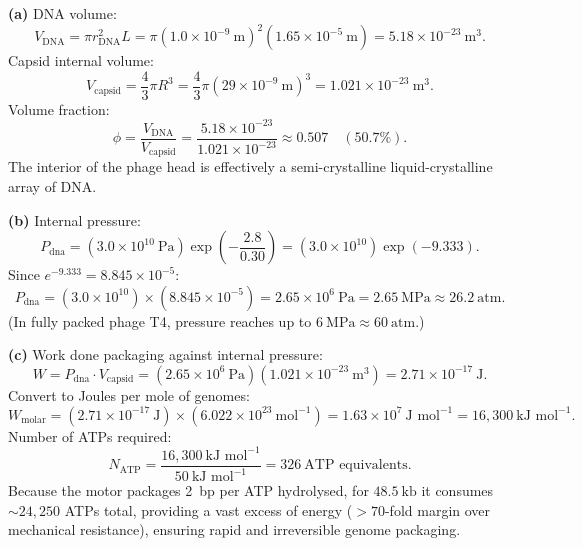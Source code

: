 \documentclass[12pt, a4paper, oneside]{report}
\begin{document}
\begin{solution}
  \textbf{(a)} DNA volume:
  \[
    V_{\text{DNA}} = \pi r_{\text{DNA}}^2 L = \pi (1.0 \times 10^{-9}~\text{m})^2 (1.65 \times 10^{-5}~\text{m}) = 5.18 \times 10^{-23}~\text{m}^3.
  \]
  Capsid internal volume:
  \[
    V_{\text{capsid}} = \frac{4}{3}\pi R^3 = \frac{4}{3}\pi (29 \times 10^{-9}~\text{m})^3 = 1.021 \times 10^{-23}~\text{m}^3.
  \]
  Volume fraction:
  \[
    \phi = \frac{V_{\text{DNA}}}{V_{\text{capsid}}} = \frac{5.18 \times 10^{-23}}{1.021 \times 10^{-23}} \approx 0.507 \quad (50.7\%).
  \]
  The interior of the phage head is effectively a semi-crystalline liquid-crystalline array of DNA.

  \textbf{(b)} Internal pressure:
  \[
    P_{\text{dna}} = (3.0 \times 10^{10}~\text{Pa}) \exp\left(-\frac{2.8}{0.30}\right) = (3.0 \times 10^{10}) \exp(-9.333).
  \]
  Since $e^{-9.333} = 8.845 \times 10^{-5}$:
  \[
    P_{\text{dna}} = (3.0 \times 10^{10}) \times (8.845 \times 10^{-5}) = 2.65 \times 10^6~\text{Pa} = 2.65~\text{MPa} \approx 26.2~\text{atm}.
  \]
  (In fully packed phage T4, pressure reaches up to $6~\text{MPa} \approx 60~\text{atm}$.)

  \textbf{(c)} Work done packaging against internal pressure:
  \[
    W = P_{\text{dna}} \cdot V_{\text{capsid}} = (2.65 \times 10^6~\text{Pa})(1.021 \times 10^{-23}~\text{m}^3) = 2.71 \times 10^{-17}~\text{J}.
  \]
  Convert to Joules per mole of genomes:
  \[
    W_{\text{molar}} = (2.71 \times 10^{-17}~\text{J}) \times (6.022 \times 10^{23}~\text{mol}^{-1}) = 1.63 \times 10^7~\text{J~mol}^{-1} = 16{,}300~\text{kJ~mol}^{-1}.
  \]
  Number of ATPs required:
  \[
    N_{\text{ATP}} = \frac{16{,}300~\text{kJ~mol}^{-1}}{50~\text{kJ~mol}^{-1}} = 326~\text{ATP equivalents}.
  \]
  Because the motor packages 2~bp per ATP hydrolysed, for $48.5~\text{kb}$ it consumes $\sim 24{,}250$ ATPs total, providing a vast excess of energy ($> 70$-fold margin over mechanical resistance), ensuring rapid and irreversible genome packaging.
\end{solution}

\end{document}
